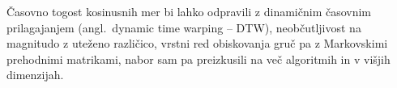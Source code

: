 \documentclass[a4paper, 12pt]{book}
\begin{document}
Časovno togost kosinusnih mer bi lahko odpravili z dinamičnim časovnim
prilagajanjem (angl.~dynamic time warping -- DTW), neobčutljivost na mag\-ni\-tu\-do z uteženo različico, vrstni red
obiskovanja gruč pa z Markovskimi prehodnimi matrikami, nabor sam pa
preizkusili na več algoritmih in v višjih dimenzijah.


\clearpage
{}


\end{document}
